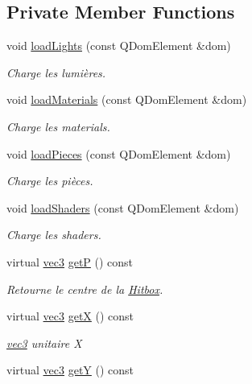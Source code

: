 \subsection*{Private Member Functions}
\begin{DoxyCompactItemize}
\item 
void \hyperlink{class_scene_a34446952ed460f5a66a90649d6f743ec}{load\+Lights} (const Q\+Dom\+Element \&dom)
\begin{DoxyCompactList}\small\item\em Charge les lumières. \end{DoxyCompactList}\item 
void \hyperlink{class_scene_a8fe39b5221775362f28c78129292e162}{load\+Materials} (const Q\+Dom\+Element \&dom)
\begin{DoxyCompactList}\small\item\em Charge les materials. \end{DoxyCompactList}\item 
void \hyperlink{class_scene_aa6d40bab1b160afc7bb84841d056a07d}{load\+Pieces} (const Q\+Dom\+Element \&dom)
\begin{DoxyCompactList}\small\item\em Charge les pièces. \end{DoxyCompactList}\item 
void \hyperlink{class_scene_a1deb5bb022836f4b585c8580246b26cb}{load\+Shaders} (const Q\+Dom\+Element \&dom)
\begin{DoxyCompactList}\small\item\em Charge les shaders. \end{DoxyCompactList}\item 
virtual \hyperlink{structvec3}{vec3} \hyperlink{class_scene_a31be15d8114d6d9c01c312cbe1a41ed6}{get\+P} () const 
\begin{DoxyCompactList}\small\item\em Retourne le centre de la \hyperlink{class_hitbox}{Hitbox}. \end{DoxyCompactList}\item 
virtual \hyperlink{structvec3}{vec3} \hyperlink{class_scene_a1a35eb36ad2c6b5bf748c31933e4ea5b}{get\+X} () const 
\begin{DoxyCompactList}\small\item\em \hyperlink{structvec3}{vec3} unitaire X \end{DoxyCompactList}\item 
virtual \hyperlink{structvec3}{vec3} \hyperlink{class_scene_a8b925540bc8fc2976eec67998f5c3bd3}{get\+Y} () const 

\end{DoxyCompactItemize}
